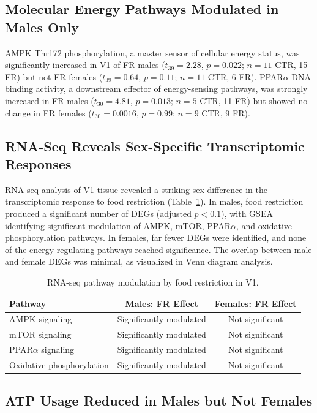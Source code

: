 \documentclass[11pt]{article}
\begin{document}
\subsection{Molecular Energy Pathways Modulated in Males Only}

AMPK Thr172 phosphorylation, a master sensor of cellular energy status, was significantly increased in V1 of FR males ($t_{39} = 2.28$, $p = 0.022$; $n = 11$ CTR, 15 FR) but not FR females ($t_{39} = 0.64$, $p = 0.11$; $n = 11$ CTR, 6 FR). PPAR$\alpha$ DNA binding activity, a downstream effector of energy-sensing pathways, was strongly increased in FR males ($t_{30} = 4.81$, $p = 0.013$; $n = 5$ CTR, 11 FR) but showed no change in FR females ($t_{30} = 0.0016$, $p = 0.99$; $n = 9$ CTR, 9 FR).

\subsection{RNA-Seq Reveals Sex-Specific Transcriptomic Responses}

RNA-seq analysis of V1 tissue revealed a striking sex difference in the transcriptomic response to food restriction (Table~\ref{tab:rnaseq}). In males, food restriction produced a significant number of DEGs (adjusted $p < 0.1$), with GSEA identifying significant modulation of AMPK, mTOR, PPAR$\alpha$, and oxidative phosphorylation pathways. In females, far fewer DEGs were identified, and none of the energy-regulating pathways reached significance. The overlap between male and female DEGs was minimal, as visualized in Venn diagram analysis.

\begin{table}[h]
\centering
\caption{RNA-seq pathway modulation by food restriction in V1.}
\label{tab:rnaseq}
\begin{tabular}{lcc}
\toprule
Pathway & Males: FR Effect & Females: FR Effect \\
\midrule
AMPK signaling & Significantly modulated & Not significant \\
mTOR signaling & Significantly modulated & Not significant \\
PPAR$\alpha$ signaling & Significantly modulated & Not significant \\
Oxidative phosphorylation & Significantly modulated & Not significant \\
\bottomrule
\end{tabular}
\end{table}

\subsection{ATP Usage Reduced in Males but Not Females}
\end{document}
